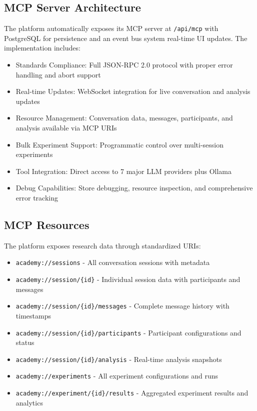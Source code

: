 \documentclass[11pt,letterpaper]{article}
\begin{document}
\subsection{MCP Server Architecture}

The platform automatically exposes its MCP server at \texttt{/api/mcp} with PostgreSQL for persistence and an event bus system real-time UI updates. The implementation includes:

\begin{itemize}
    \item Standards Compliance: Full JSON-RPC 2.0 protocol with proper error handling and abort support
    \item Real-time Updates: WebSocket integration for live conversation and analysis updates
    \item Resource Management: Conversation data, messages, participants, and analysis available via MCP URIs
    \item Bulk Experiment Support: Programmatic control over multi-session experiments
    \item Tool Integration: Direct access to 7 major LLM providers plus Ollama
    \item Debug Capabilities: Store debugging, resource inspection, and comprehensive error tracking
\end{itemize}

\subsection{MCP Resources}

The platform exposes research data through standardized URIs:
\begin{itemize}
    \item \texttt{academy://sessions} - All conversation sessions with metadata
    \item \texttt{academy://session/\{id\}} - Individual session data with participants and messages
    \item \texttt{academy://session/\{id\}/messages} - Complete message history with timestamps
    \item \texttt{academy://session/\{id\}/participants} - Participant configurations and status
    \item \texttt{academy://session/\{id\}/analysis} - Real-time analysis snapshots
    \item \texttt{academy://experiments} - All experiment configurations and runs
    \item \texttt{academy://experiment/\{id\}/results} - Aggregated experiment results and analytics
\end{itemize}
\end{document}
